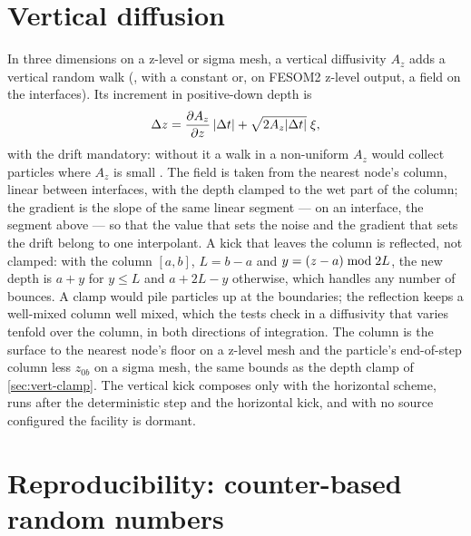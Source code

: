 \section{Vertical diffusion}\label{sec:diff-vertical}

In three dimensions on a z-level or sigma mesh, a vertical diffusivity $A_z$ adds a vertical random walk
(, with a constant  or, on FESOM2 z-level output, a field 
on the interfaces). Its increment in positive-down depth is
\begin{equation}\label{eq:diff-az}
  \Delta z=\frac{\partial A_z}{\partial z}\,\lvert\Delta t\rvert+\sqrt{2A_z\lvert\Delta t\rvert}\;\xi ,
\end{equation}
with the drift mandatory: without it a walk in a non-uniform $A_z$ would collect particles where $A_z$ is
small \citep{visser1997random}. The field is taken from the nearest node's column, linear between
interfaces, with the depth clamped to the wet part of the column; the gradient is the slope of the same
linear segment --- on an interface, the segment above --- so that the value that sets the noise and the
gradient that sets the drift belong to one interpolant. A kick that leaves the column is reflected, not
clamped: with the column $[a,b]$, $L=b-a$ and $y=(z-a)\bmod 2L$, the new depth is $a+y$ for $y\le L$
and $a+2L-y$ otherwise, which handles any number of bounces. A clamp would pile particles up at the
boundaries; the reflection keeps a well-mixed column well mixed, which the tests check in a diffusivity
that varies tenfold over the column, in both directions of integration. The column is the surface to the
nearest node's floor on a z-level mesh and the particle's end-of-step column less $z_{0b}$ on a sigma mesh,
the same bounds as the depth clamp of \cref{sec:vert-clamp}. The vertical kick composes only with the
 horizontal scheme, runs after the deterministic step and the horizontal kick, and with no
source configured the facility is dormant.


\section{Reproducibility: counter-based random numbers}\label{sec:diff-rng}

